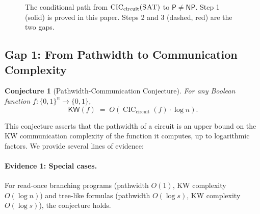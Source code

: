 \documentclass[11pt]{article}
\theoremstyle{plain}
\newtheorem{conjecture}[theorem]{Conjecture}
\theoremstyle{definition}
\newcommand{\CIC}{\operatorname{CIC}}
\newcommand{\CICcirc}{\CIC_{\text{circuit}}}
\newcommand{\SAT}{\textsc{SAT}}
\newcommand{\KW}{\mathsf{KW}}
\newcommand{\Pclass}{\mathsf{P}}
\newcommand{\NP}{\mathsf{NP}}
\newcommand{\set}[1]{\{#1\}}
\begin{document}
\begin{figure}[htbp]
\centering
{}
\caption{The conditional path from $\CICcirc(\SAT)$ to $\Pclass \neq \NP$. Step 1 (solid) is proved in this paper. Steps 2 and 3 (dashed, red) are the two gaps.}
\label{fig:path}
\end{figure}

\subsection{Gap 1: From Pathwidth to Communication Complexity}

\begin{conjecture}[Pathwidth-Communication Conjecture]\label{conj:gap1}
For any Boolean function $f : \set{0,1}^n \to \set{0,1}$,
\[
\KW(f) \;=\; O(\CICcirc(f) \cdot \log n).
\]
\end{conjecture}

This conjecture asserts that the pathwidth of a circuit is an upper bound on the KW communication complexity of the function it computes, up to logarithmic factors. We provide several lines of evidence:

\paragraph{Evidence 1: Special cases.} For read-once branching programs (pathwidth $O(1)$, KW complexity $O(\log n)$) and tree-like formulas (pathwidth $O(\log s)$, KW complexity $O(\log s)$), the conjecture holds.
\end{document}
